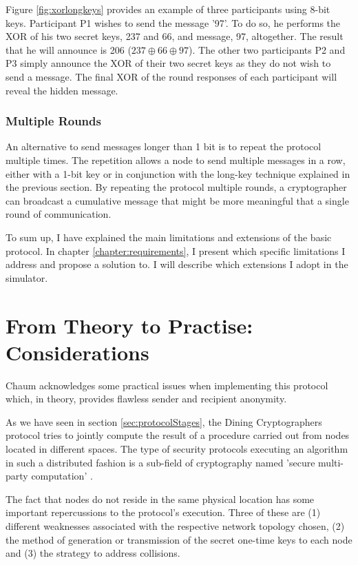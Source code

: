 Figure \ref{fig:xorlongkeys} provides an example of three participants using 8-bit keys. Participant P1 wishes to send the message '97'. To do so, he performs the XOR of his two secret keys, 237 and 66, and message, 97, altogether. The result that he will announce is 206 ($237 \oplus 66 \oplus 97$). The other two participants P2 and P3 simply announce the XOR of their two secret keys as they do not wish to send a message. The final XOR of the round responses of each participant will reveal the hidden message.


\subsubsection{Multiple Rounds} \label{sec:messageExtentionRounds}
An alternative to send messages longer than 1 bit is to repeat the protocol multiple times. The repetition allows a node to send multiple messages in a row, either with a 1-bit key or in conjunction with the long-key technique explained in the previous section. By repeating the protocol multiple rounds, a cryptographer can broadcast a cumulative message that might be more meaningful that a single round of communication. \newline

To sum up, I have explained the main limitations and extensions of the basic protocol. In chapter \ref{chapter:requirements}, I present which specific limitations I address and propose a solution to. I will describe which extensions I adopt in the simulator.

\section{From Theory to Practise: Considerations}
Chaum acknowledges some practical issues when implementing this protocol which, in theory, provides flawless sender and recipient anonymity.

As we have seen in section \ref{sec:protocolStages}, the Dining Cryptographers protocol tries to jointly compute the result of a procedure carried out from nodes located in different spaces. The type of security protocols executing an algorithm in such a distributed fashion is a sub-field of cryptography named 'secure multi-party computation' \cite{wiki1}.

The fact that nodes do not reside in the same physical location has some important repercussions to the protocol's execution. Three of these are (1) different weaknesses associated with the respective network topology chosen, (2) the method of generation or transmission of the secret one-time keys to each node and (3) the strategy to address collisions.

